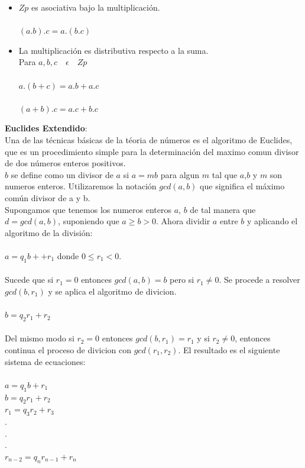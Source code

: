 \documentclass[12pt,oneside,onecolumn,openany]{report}
\begin{document}
\begin{itemize}
 \item $Zp$ es asociativa bajo la multiplicación.\\\\
 $(a . b) . c  =  a . (b . c)$
 \item La multiplicación es distributiva respecto a la suma.\\
 Para $a,b,c\quad\epsilon\quad Zp$\\\\
 $a.(b+c)=a.b+a.c$\\\\
 $(a+b).c=a.c+b.c$
\end{itemize}


\textbf{Euclides Extendido}:\\
Una de las técnicas básicas de la téoria de números es el algoritmo de Euclides, que es un procedimiento simple para la determinación del maximo comun 	divisor de dos números enteros positivos.\\
$b$ se define como un divisor de $a$ si $a=mb$ para algun $m$ tal que $a$,$b$ y $m$ son numeros enteros.
Utilizaremos la notación $gcd (a, b)$ que significa el máximo común divisor de a y b.\\
Supongamos que tenemos los numeros enteros $a$, $b$ de tal manera que $d=gcd(a,b)$, suponiendo que $a\geq b > 0$. Ahora dividir $a$ entre $b$ y aplicando el algoritmo de la división:\\\\
$a=q_1b++r_1$   donde $0\leq r_1<0$.\\\\
Sucede que si $r_1=0$ entonces $gcd(a,b)=b$ pero si $r_1\neq 0$. Se procede a resolver $gcd(b,r_1)$ y se aplica el algoritmo de divicion.\\\\
$b=q_2r_1+r_2$\\\\
Del mismo modo si $r_2=0$ entonces $gcd(b,r_1)=r_1$ y si $r_2\neq 0$, entonces continua el proceso de divicion con $gcd(r_1,r_2)$. El resultado es el siguiente sistema de ecuaciones:\\\\
$a=q_1b+r_1$\\
$b=q_2r_1+r_2$\\
$r_1=q_3r_2+r_3$\\
$.$\\
$.$\\
$.$\\
$r_{n-2}=q_nr_{n-1}+r_n$\\
\end{document}
